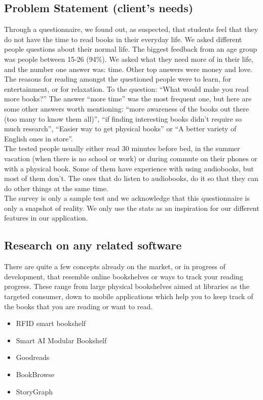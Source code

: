 \documentclass[conference]{IEEEtran}
\begin{document}
\subsection*{Problem Statement (client's needs)}
Through a questionnaire, we found out, as suspected, that students feel that they do not have the time to read books in their everyday life. We asked different people questions about their normal life. The biggest feedback from an age group was people between 15-26 (94\%). We asked what they need more of in their life, and the number one answer was: time. Other top answers were money and love.\\
The reasons for reading amongst the questioned people were to learn, for entertainment, or for relaxation. To the question: “What would make you read more books?” The answer “more time” was the most frequent one, but here are some other answers worth mentioning: “more awareness of the books out there (too many to know them all)”, “if finding interesting books didn’t require so much research”, “Easier way to get physical books” or “A better variety of English ones in store”.\\
The tested people usually either read 30 minutes before bed, in the summer vacation (when there is no school or work) or during commute on their phones or with a physical book. Some of them have experience with using audiobooks, but most of them don't. The ones that do listen to audiobooks, do it so that they can do other things at the same time.\\
The survey is only a sample test and we acknowledge that this questionnaire is only a snapshot of reality. We only use the stats as an inspiration for our different features in our application.


\subsection*{Research on any related software}
There are quite a few concepts already on the market, or in progress of development, that resemble online bookshelves or ways to track your reading progress. These range from large physical bookshelves aimed at libraries as the targeted consumer, down to mobile applications which help you to keep track of the books that you are reading or want to read.
\begin{itemize}
	\item RFID smart bookshelf
	\item Smart AI Modular Bookshelf
	\item Goodreads
	\item BookBrowse
	\item StoryGraph
\end{itemize}
\end{document}
